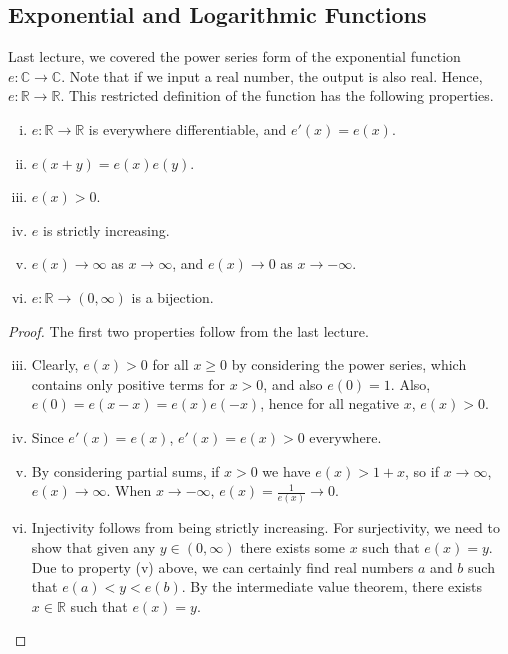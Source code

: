 \documentclass{article}
\begin{document}
\subsection{Exponential and Logarithmic Functions}
Last lecture, we covered the power series form of the exponential function $e \colon \mathbb C \to \mathbb C$. Note that if we input a real number, the output is also real. Hence, $e \colon \mathbb R \to \mathbb R$. This restricted definition of the function has the following properties.
\begin{theorem}
    \begin{enumerate}[(i)]
        \item $e \colon \mathbb R \to \mathbb R$ is everywhere differentiable, and $e'(x) = e(x)$.
        \item $e(x+y) = e(x)e(y)$.
        \item $e(x) > 0$.
        \item $e$ is strictly increasing.
        \item $e(x) \to \infty$ as $x \to \infty$, and $e(x) \to 0$ as $x \to -\infty$.
        \item $e \colon \mathbb R \to (0, \infty)$ is a bijection.
    \end{enumerate}
\end{theorem}
\begin{proof}
    The first two properties follow from the last lecture.
    \begin{enumerate}[(i)]
        \setcounter{enumi}{2}
        \item Clearly, $e(x) > 0$ for all $x \geq 0$ by considering the power series, which contains only positive terms for $x>0$, and also $e(0) = 1$. Also, $e(0) = e(x - x) = e(x)e(-x)$, hence for all negative $x$, $e(x) > 0$.
        \item Since $e'(x) = e(x)$, $e'(x) = e(x) > 0$ everywhere.
        \item By considering partial sums, if $x>0$ we have $e(x) > 1+x$, so if $x \to \infty$, $e(x) \to \infty$. When $x \to -\infty$, $e(x) = \frac{1}{e(x)} \to 0$.
        \item Injectivity follows from being strictly increasing. For surjectivity, we need to show that given any $y \in (0, \infty)$ there exists some $x$ such that $e(x) = y$. Due to property (v) above, we can certainly find real numbers $a$ and $b$ such that $e(a) < y < e(b)$. By the intermediate value theorem, there exists $x \in \mathbb R$ such that $e(x) = y$.
    \end{enumerate}
\end{proof}
\end{document}
